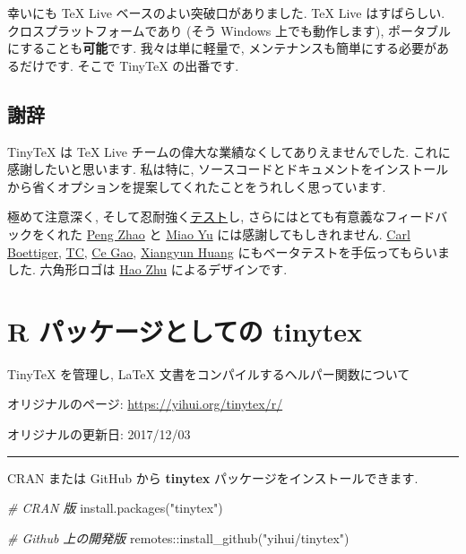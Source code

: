\documentclass[
  xelatex,ja=standard,jafont=noto]{bxjsreport}
\newenvironment{Shaded}{\begin{snugshade}}{\end{snugshade}}
\newcommand{\CommentTok}[1]{\textcolor[rgb]{0.56,0.35,0.01}{\textit{#1}}}
\newcommand{\FunctionTok}[1]{\textcolor[rgb]{0.00,0.00,0.00}{#1}}
\newcommand{\NormalTok}[1]{#1}
\newcommand{\SpecialCharTok}[1]{\textcolor[rgb]{0.00,0.00,0.00}{#1}}
\newcommand{\StringTok}[1]{\textcolor[rgb]{0.31,0.60,0.02}{#1}}
\begin{document}
幸いにも TeX Live ベースのよい突破口がありました. TeX Live はすばらしい.
クロスプラットフォームであり (そう Windows 上でも動作します),
ポータブルにすることも\textbf{可能}です. 我々は単に軽量で,
メンテナンスも簡単にする必要があるだけです. そこで TinyTeX の出番です.

\hypertarget{ux8b1dux8f9e}{%
\section{謝辞}\label{ux8b1dux8f9e}}

TinyTeX は TeX Live チームの偉大な業績なくしてありえませんでした.
これに感謝したいと思います. 私は特に,
ソースコードとドキュメントをインストールから省くオプションを提案してくれたことをうれしく思っています.

極めて注意深く,
そして忍耐強く\href{https://d.cosx.org/d/419672}{テスト}し,
さらにはとても有意義なフィードバックをくれた
\href{http://www.pzhao.org}{Peng Zhao} と \href{https://yufree.cn}{Miao
Yu} には感謝してもしきれません.
\href{https://www.carlboettiger.info}{Carl Boettiger},
\href{http://tc.rbind.io}{TC}, \href{https://github.com/gaocegege}{Ce
Gao}, \href{https://github.com/XiangyunHuang}{Xiangyun Huang}
にもベータテストを手伝ってもらいました. 六角形ロゴは
\href{https://github.com/haozhu233}{Hao Zhu} によるデザインです.

\hypertarget{r}{%
\chapter{\texorpdfstring{R パッケージとしての
\textbf{tinytex}}{R パッケージとしての tinytex}}\label{r}}

TinyTeX を管理し, LaTeX 文書をコンパイルするヘルパー関数について

オリジナルのページ: \url{https://yihui.org/tinytex/r/}

オリジナルの更新日: 2017/12/03

\begin{center}\rule{0.5\linewidth}{0.5pt}\end{center}

CRAN または GitHub から \textbf{tinytex}
パッケージをインストールできます.

\begin{Shaded}
\begin{Highlighting}[numbers=left,,]
\CommentTok{\# CRAN 版}
\FunctionTok{install.packages}\NormalTok{(}\StringTok{"tinytex"}\NormalTok{)}

\CommentTok{\# Github 上の開発版}
\NormalTok{remotes}\SpecialCharTok{::}\FunctionTok{install\_github}\NormalTok{(}\StringTok{"yihui/tinytex"}\NormalTok{)}
\end{Highlighting}
\end{Shaded}
\end{document}
